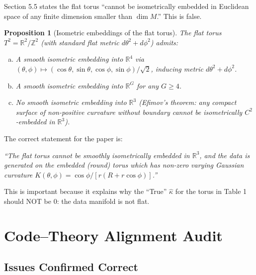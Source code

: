 \documentclass[11pt]{article}
\newtheorem{proposition}{Proposition}
\newcommand{\R}{\mathbb{R}}
\newcommand{\Z}{\mathbb{Z}}
\begin{document}
\begin{gapbox}
Section 5.5 states the flat torus ``cannot be isometrically embedded in Euclidean
space of any finite dimension smaller than $\dim M$.'' This is false.
\end{gapbox}

\begin{bridgebox}
\begin{proposition}[Isometric embeddings of the flat torus]
The flat torus $T^2 = \R^2 / \Z^2$ (with standard flat metric $d\theta^2 + d\phi^2$)
admits:
\begin{enumerate}[(a)]
\item A smooth isometric embedding into $\R^4$ via
$(\theta,\phi) \mapsto (\cos\theta, \sin\theta, \cos\phi, \sin\phi)/\sqrt{2}$,
inducing metric $d\theta^2 + d\phi^2$.
\item A smooth isometric embedding into $\R^G$ for any $G \ge 4$.
\item No smooth isometric embedding into $\R^3$ (Efimov's theorem: any compact
surface of non-positive curvature without boundary cannot be isometrically
$C^2$-embedded in $\R^3$).
\end{enumerate}
\end{proposition}

The correct statement for the paper is:
\begin{center}\itshape
``The flat torus cannot be smoothly isometrically embedded in $\R^3$, and the
data is generated on the \emph{embedded} (round) torus which has non-zero varying
Gaussian curvature $K(\theta,\phi) = \cos\phi/[r(R+r\cos\phi)]$.''
\end{center}
This is important because it explains why the ``True'' $\hat\kappa$ for the torus
in Table 1 should NOT be 0: the data manifold is not flat.
\end{bridgebox}

\section{Code--Theory Alignment Audit}

\subsection{Issues Confirmed Correct}
\end{document}
